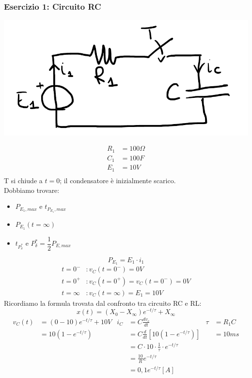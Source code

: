 \documentclass{article}
\begin{document}
\subsubsection{Esercizio 1: Circuito RC}
\begin{center}
    \includegraphics[scale=0.35]{Image/Es_1_Trans_1.png}
\end{center}
\begin{align*}
    R_1 &= 100 \Omega\\
    C_1 &= 100 F\\
    E_1 &= 10V\\
\end{align*}
T si chiude a $t=0$; il condensatore è inizialmente scarico.
\vspace*{0.1cm}\\
Dobbiamo trovare:
\begin{itemize}
    \item $P_{E_1,max}$ e $t_{P_{E_1}, max}$
    \item $P_{E_1}(t=\infty)$
    \item $t_{P_\delta^*}$ e $P_\delta^* = \dfrac{1}{2}P_{E,max}$
\end{itemize}
\[P_{E_1} = E_1 \cdot i_1\]
\begin{align*}
    t=0^- &: v_C(t=0^-) = 0V\\
    t=0^+ &: v_C(t=0^+) = v_C(t=0^-) = 0V\\
    t= \infty &: v_C(t = \infty) = E_1 = 10V
\end{align*}
Ricordiamo la formula trovata dal confronto tra circuito RC e RL:
\[x(t) = \left(X_0-X_{\infty}\right)e^{-t/\tau} + X_{\infty}\]
\begin{align*}
    v_C(t) &= (0-10)e^{-t/\tau} + 10V & i_C &= C\frac{dv_c}{dt} & \tau &= R_1C \\
    &= 10\left(1 - e^{-t/\tau}\right) & &=C \frac{d}{dt}\left[10 \left(1-e^{-t/\tau}\right)\right] & &=10ms\\
    & & &=C\cdot 10 \cdot \frac{1}{\tau} \cdot e^{-t/\tau}\\
    & & &=\frac{10}{R} e^{-t/\tau}\\
    & & &=0,1 e^{-t/\tau} [A]
\end{align*}
\end{document}
